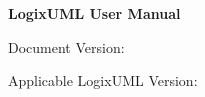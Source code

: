 \begin{titlepage}

  \vspace*{1in}

  \centering
  \Huge
  \textbf{LogixUML User Manual}

  \vspace*{\fill}

  \raggedleft
  \noindent
  \Large
  Document Version:
  \par
  Applicable LogixUML Version:

\end{titlepage}
